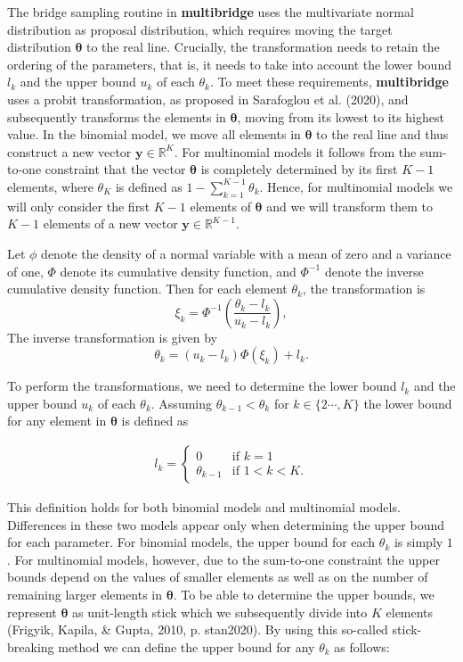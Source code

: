 \documentclass[
  english,
  man,floatsintext]{apa6}
\begin{document}
The bridge sampling routine in \textbf{multibridge} uses the
multivariate normal distribution as proposal distribution, which
requires moving the target distribution \(\boldsymbol{\theta}\) to the
real line. Crucially, the transformation needs to retain the ordering of
the parameters, that is, it needs to take into account the lower bound
\(l_k\) and the upper bound \(u_k\) of each \(\theta_k\). To meet these
requirements, \textbf{multibridge} uses a probit transformation, as
proposed in Sarafoglou et al. (2020), and subsequently transforms the
elements in \(\boldsymbol{\theta}\), moving from its lowest to its
highest value. In the binomial model, we move all elements in
\(\boldsymbol{\theta}\) to the real line and thus construct a new vector
\(\boldsymbol{y} \in \mathbb{R}^{K}\). For multinomial models it follows
from the sum-to-one constraint that the vector \(\boldsymbol{\theta}\)
is completely determined by its first \(K - 1\) elements, where
\(\theta_K\) is defined as \(1 - \sum_{k = 1}^{K-1} \theta_k\). Hence,
for multinomial models we will only consider the first \(K - 1\)
elements of \(\boldsymbol{\theta}\) and we will transform them to
\(K - 1\) elements of a new vector
\(\boldsymbol{y} \in \mathbb{R}^{K - 1}\).

Let \(\phi\) denote the density of a normal variable with a mean of zero
and a variance of one, \(\Phi\) denote its cumulative density function,
and \(\Phi^{-1}\) denote the inverse cumulative density function. Then
for each element \(\theta_k\), the transformation is
\[\xi_k = \Phi^{-1}\left(\frac{\theta_k - l_k}{u_k - l_k}\right),\] The
inverse transformation is given by
\[\theta_k = (u_k - l_k) \Phi(\xi_k) + l_k.\]

To perform the transformations, we need to determine the lower bound
\(l_k\) and the upper bound \(u_k\) of each \(\theta_k\). Assuming
\(\theta_{k-1} < \theta_{k}\) for \(k \in \{2 \cdots, K\}\) the lower
bound for any element in \(\boldsymbol{\theta}\) is defined as

\begin{align*}
l_k = \left.
\begin{cases}
0 & \text{if } k = 1 \\
\theta_{k - 1} & \text{if } 1 < k < K.
\end{cases}
\right.
\end{align*}

This definition holds for both binomial models and multinomial models.
Differences in these two models appear only when determining the upper
bound for each parameter. For binomial models, the upper bound for each
\(\theta_k\) is simply \(1\). For multinomial models, however, due to
the sum-to-one constraint the upper bounds depend on the values of
smaller elements as well as on the number of remaining larger elements
in \(\boldsymbol{\theta}\). To be able to determine the upper bounds, we
represent \(\boldsymbol{\theta}\) as unit-length stick which we
subsequently divide into \(K\) elements (Frigyik, Kapila, \& Gupta, 2010, p. stan2020). By using this so-called
stick-breaking method we can define the upper bound for any \(\theta_k\)
as follows:
\end{document}
